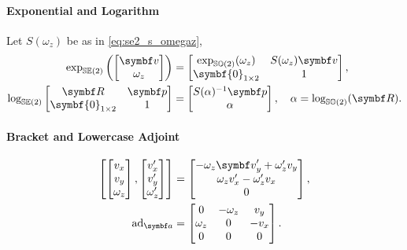 \begin{properties}[breakable, title={$\SEtwo$ formula sheet}]
  \paragraph{Exponential and Logarithm}
  Let $S(\omega_z)$ be as in \eqref{eq:se2_s_omegaz},
  \begin{subequations}
    \label{eq:se2_exp_log}
    \begin{align}
      \label{eq:se2_exp}
      \exp_\SEtwo \left(\begin{bmatrix} \bv \\ \omega_{z} \end{bmatrix} \right) & =  \begin{bmatrix}
        \exp_{\SOtwo} (\omega_z) & S(\omega_z)\bv \\ \symbf{0}_{1 \times 2} & 1
      \end{bmatrix},                                 \\
      \label{eq:se2_log}
      \log_\SEtwo \begin{bmatrix} \bR & \bp \\ \symbf{0}_{1 \times 2} & 1 \end{bmatrix}               & = \begin{bmatrix} S(\alpha)^{-1} \bp \\ \alpha \end{bmatrix}, \quad \alpha = \log_\SOtwo(\bR).
    \end{align}
  \end{subequations}

  \paragraph{Bracket and Lowercase Adjoint}
  \begin{equation}
    \begin{aligned}
      \left[
        \begin{bmatrix} v_{x} \\ v_{y} \\ \omega_{z} \end{bmatrix},     \begin{bmatrix} v_{x}' \\ v_{y}' \\ \omega_{z}' \end{bmatrix}
      \right] & = \begin{bmatrix} -\omega_{z} \bv_{y}' + \omega_{z}' v_{y} \\ \omega_{z} v_{x}' - \omega_{z}' v_{x} \\ 0 \end{bmatrix},  \\
      \ad_\a  & =  \begin{bmatrix}  0 & -\omega_z & v_y \\ \omega_z & 0 & -v_x \\ 0 & 0 & 0 \end{bmatrix}.
    \end{aligned}
  \end{equation}


\end{properties}
